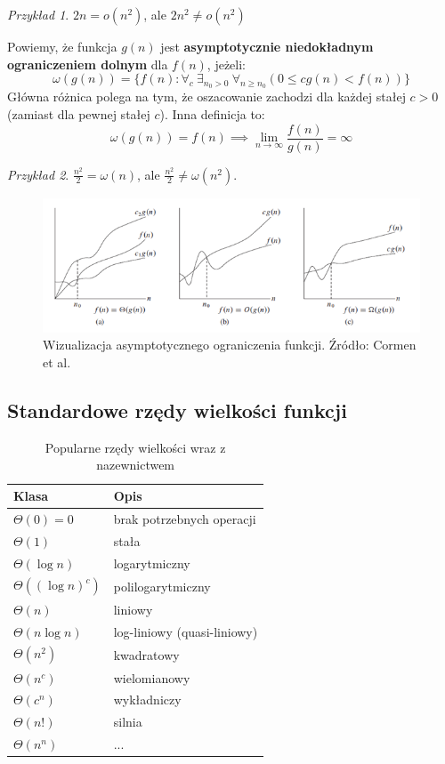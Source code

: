 \documentclass[10pt, oneside]{article}
\theoremstyle{remark}
\newtheorem*{example}{Przykład}
\begin{document}
\begin{example}
$2n = o(n^2)$, ale $2n^2 \neq o(n^2)$
\end{example}

Powiemy, że funkcja $g(n)$ jest \textbf{asymptotycznie niedokładnym ograniczeniem dolnym} dla $f(n)$, jeżeli:
$$
\omega(g(n)) = \{ f(n): \forall_{c}\ \exists_{n_0>0}\ \forall_{n \geq n_0} \left(0 \leq c g(n) < f(n)  \right) \}
$$
Główna różnica polega na tym, że oszacowanie zachodzi dla każdej stałej $c>0$ (zamiast dla pewnej stałej $c$).
Inna definicja to:
$$
\omega(g(n)) = f(n) \implies \lim_{n \to \infty} \frac{f(n)}{g(n)} = \infty
$$

\begin{example}
$\frac{n^2}{2} = \omega(n)$, ale $\frac{n^2}{2} \neq \omega(n^2)$.
\end{example}


\begin{figure}
	\centering
	\includegraphics[width=.7\linewidth]{figures/big_o}
	\caption{Wizualizacja asymptotycznego ograniczenia funkcji. Źródło: Cormen et al.}
\end{figure}

\subsection{Standardowe rzędy wielkości funkcji}

\begin{table}[]
\caption{Popularne rzędy wielkości wraz z nazewnictwem}
\centering
\begin{tabular}{@{}ll@{}}
\toprule
Klasa & Opis \\ \midrule
$\Theta(0)=0$ & brak potrzebnych operacji \\
$\Theta(1)$ & stała \\
$\Theta(\log n)$ & logarytmiczny \\
$\Theta((\log n)^c)$ & polilogarytmiczny \\
$\Theta(n)$ & liniowy \\
$\Theta(n \log n)$ & log-liniowy (quasi-liniowy) \\
$\Theta(n^2)$ & kwadratowy \\
$\Theta(n^c)$ & wielomianowy \\
$\Theta(c^n)$ & wykładniczy \\
$\Theta(n!)$ & silnia \\ 
$\Theta(n^n)$ & ... \\ \bottomrule
\end{tabular}
\end{table}
\end{document}
